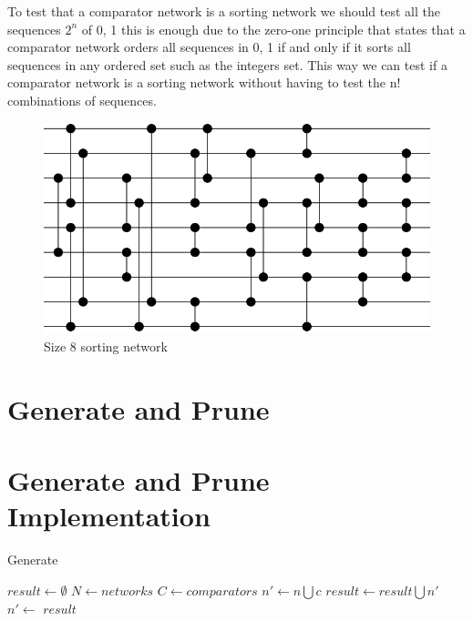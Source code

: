 \documentclass{article}
\begin{document}
To test that a comparator network is a sorting network we should test all the sequences $2^n$ of {0, 1} this is enough due to the zero-one principle that states that a comparator network orders all sequences in {0, 1} if and only if it sorts all sequences in any ordered set such as the integers set. This way we can test if a comparator network is a sorting network without having to test the n! combinations of sequences.

\begin{figure}[H]
\centering
\includegraphics[scale=0.8]{images/Size8SortingNetwork}
\caption{Size 8 sorting network}
\label{fig:images/Size8SortingNetwork}
\end{figure}

\section{Generate and Prune}

\section{Generate and Prune Implementation}
\begin{algorithm}[H]
	\caption{Generate} 
	\begin{algorithmic}
	    \STATE $result \leftarrow \emptyset$
	    \STATE $N \leftarrow networks$
        \STATE $C \leftarrow comparators$
                \STATE $n' \leftarrow n\bigcup c$
                    \STATE $result \leftarrow result \bigcup n'$
                \ENDIF
            \ENDFOR
            \STATE $n' \leftarrow $
        \ENDFOR
        \RETURN $result$
    \end{algorithmic}
\end{algorithm}
\end{document}
